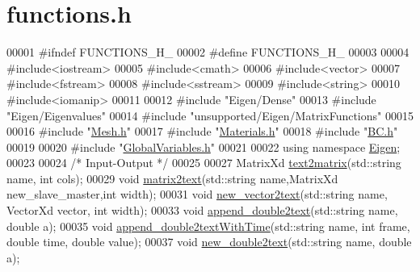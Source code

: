 \hypertarget{functions_8h_source}{}\section{functions.\+h}
\label{functions_8h_source}

\begin{DoxyCode}
00001 \textcolor{preprocessor}{#ifndef FUNCTIONS\_H\_}
00002 \textcolor{preprocessor}{#define FUNCTIONS\_H\_}
00003 
00004 \textcolor{preprocessor}{#include<iostream>}
00005 \textcolor{preprocessor}{#include<cmath>}
00006 \textcolor{preprocessor}{#include<vector>}
00007 \textcolor{preprocessor}{#include<fstream>}
00008 \textcolor{preprocessor}{#include<sstream>}
00009 \textcolor{preprocessor}{#include<string>}
00010 \textcolor{preprocessor}{#include<iomanip>}
00011 
00012 \textcolor{preprocessor}{#include "Eigen/Dense"}
00013 \textcolor{preprocessor}{#include "Eigen/Eigenvalues"}
00014 \textcolor{preprocessor}{#include "unsupported/Eigen/MatrixFunctions"}
00015 
00016 \textcolor{preprocessor}{#include "\hyperlink{_mesh_8h}{Mesh.h}"}
00017 \textcolor{preprocessor}{#include "\hyperlink{_materials_8h}{Materials.h}"}
00018 \textcolor{preprocessor}{#include "\hyperlink{_b_c_8h}{BC.h}"}
00019 
00020 \textcolor{preprocessor}{#include "\hyperlink{_global_variables_8h}{GlobalVariables.h}"}
00021 
00022 \textcolor{keyword}{using namespace }\hyperlink{namespace_eigen}{Eigen};
00023 
00024 \textcolor{comment}{/* Input-Output */}
00025 
00027 MatrixXd \hyperlink{functions_8h_add4fca63e194477644c3388febf88023}{text2matrix}(std::string name, \textcolor{keywordtype}{int} cols);
00029 \textcolor{keywordtype}{void} \hyperlink{functions_8h_a346547477d2a1fbeff6b5e0b05314283}{matrix2text}(std::string name,MatrixXd new\_slave\_master,\textcolor{keywordtype}{int} width);
00031 \textcolor{keywordtype}{void} \hyperlink{functions_8h_a62d4a4906ace3f822fcebf7605c33c2b}{new\_vector2text}(std::string name, VectorXd vector, \textcolor{keywordtype}{int} width);
00033 \textcolor{keywordtype}{void} \hyperlink{functions_8h_aab8577bce9169902e0f328ddbc334cdc}{append\_double2text}(std::string name, \textcolor{keywordtype}{double} a);
00035 \textcolor{keywordtype}{void} \hyperlink{functions_8h_a6908d3739a96b475c5f4c1623fad9316}{append\_double2textWithTime}(std::string name, \textcolor{keywordtype}{int} frame, \textcolor{keywordtype}{double} time, \textcolor{keywordtype}{double} 
      value);
00037 \textcolor{keywordtype}{void} \hyperlink{functions_8h_ac861444df7684273e6c70504541eb892}{new\_double2text}(std::string name, \textcolor{keywordtype}{double} a);

\end{DoxyCode}
